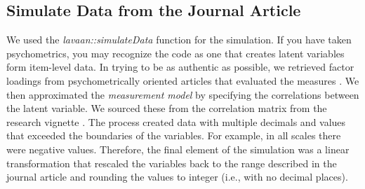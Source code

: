 \documentclass[
  11pt,
]{book}
\begin{document}
\hypertarget{simulate-data-from-the-journal-article}{%
\subsection{Simulate Data from the Journal Article}\label{simulate-data-from-the-journal-article}}

We used the \emph{lavaan::simulateData} function for the simulation. If you have taken psychometrics, you may recognize the code as one that creates latent variables form item-level data. In trying to be as authentic as possible, we retrieved factor loadings from psychometrically oriented articles that evaluated the measures \citep{nadal_racial_2011, veit_structure_1983}. We then approximated the \emph{measurement model} by specifying the correlations between the latent variable. We sourced these from the correlation matrix from the research vignette \citep{kim_racial_2017}. The process created data with multiple decimals and values that exceeded the boundaries of the variables. For example, in all scales there were negative values. Therefore, the final element of the simulation was a linear transformation that rescaled the variables back to the range described in the journal article and rounding the values to integer (i.e., with no decimal places).
\end{document}
